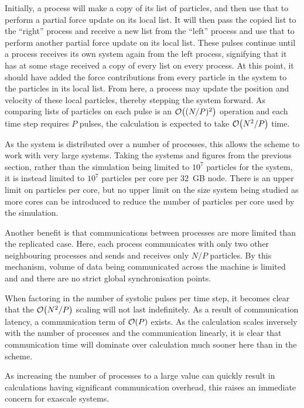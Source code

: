 Initially, a process will make a copy of its list of particles,
and then use that to perform a partial force update on its local list.
%
It will then pass the copied list to the ``right'' process and
receive a new list from the ``left'' process and use that to perform
another partial force update on its local list.
%
These pulses continue until a process receives its own system again from
the left process, signifying that it has at some stage received
a copy of every list on every process.
%
At this point, it should have added the force contributions from
every particle in the system to the particles in its local list.
%
From here, a process may update the position and velocity of these local
particles, thereby stepping the system forward.
%
As comparing lists of particles on each pulse is an $\mathcal{O}{\left({ (N/P)^2 }\right)}$ operation
and each time step requires $P$ pulses, the calculation is expected to take
$\mathcal{O}{\left({ N^2/P }\right)}$ time.


%
As the system is distributed over a number of processes, this allows
the scheme to work with very large systems.
%
Taking the systems and figures from the previous section,
rather than the simulation being limited to $10^7$ particles for the system,
it is instead limited to $10^7$ particles per core per 32~GB node.
%
There is an upper limit on particles per core, but no
upper limit on the size system being studied as more cores can be introduced
to reduce the number of particles per core used by the simulation.

Another benefit is that
communications between processes are more limited than
the replicated case.
%
Here, each process communicates with only two other neighbouring processes
and sends and receives only $N/P$ particles.
%
By this mechanism, volume of data
being communicated across the machine is limited
and and there are no strict global synchronisation points.

When factoring in the number of systolic pulses per time step,
it becomes clear that the $\mathcal{O}{\left({ N^2/P }\right)}$ scaling will not last indefinitely.
%
As a result of communication latency, a communication term of
$\mathcal{O}{\left({ P }\right)}$ exists.
%
As the calculation scales inversely with the number of processes
and the communication linearly, it is clear that communication time will
dominate over calculation much sooner here than
in the \replicateddata{} scheme.

%
As increasing the number of processes to a large value
can quickly result in calculations having significant communication overhead,
this raises an immediate concern for exascale systems.


